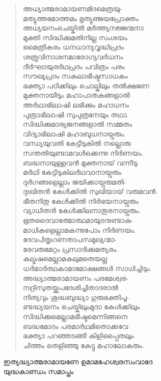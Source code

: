 \begin{verse}
അധ്യാത്മരാമായണമിദമെത്രയു-\\
മത്യുത്തമോത്തമം മൃത്യുഞ്ജയപ്രോക്തം\\
അധ്യയനംചെയ്കില്‍ മര്‍ത്ത്യനജ്ജന്മനാ\\
മുക്തി സിദ്ധിക്കുമതിനില്ല സംശയം.\\
മൈത്രീകരം ധനധാന്യവൃദ്ധിപ്രദം\\
ശത്രുവിനാശനമാരോഗ്യവര്‍ധനം\\
ദീര്‍ഘായുരര്‍ഥപ്രദം പവിത്രം പരം\\
സൗഖ്യപ്രദം സകലാഭീഷ്ടസാധകം\\
ഭക്ത്യാ പഠിക്കിലും ചൊല്കിലും തല്‍ക്ഷണേ\\
മുക്തനായീടും മഹാപാതകങ്ങളാല്‍\\
അര്‍ഥാഭിലാഷി ലഭിക്കും മഹാധനം\\
പുത്രാഭിലാഷി സുപുത്രനേയും തഥാ.\\
സിദ്ധിക്കുമാര്യജനങ്ങളാല്‍ സമ്മതം\\
വിദ്യാഭിലാഷി മഹാബുധനായ്വരും.\\
വന്ധ്യയുവതി കേട്ടീടുകില്‍ നല്ലൊരു\\
സന്തതിയുണ്ടാമവള്‍ക്കെന്നു നിര്‍ണയം.\\
ബദ്ധനായുള്ളവന്‍ മുക്തനായ് വന്നീടു-\\
മര്‍ഥി കേട്ടീടുകിലര്‍ഥവാനായ്വരും\\
ദുര്‍ഗങ്ങളെല്ലാം ജയിക്കായ്വരുമതി-\\
ദുഃഖിതന്‍ കേള്‍ക്കില്‍ സുഖിയായ് വരുമവന്‍.\\
ഭീതനിതു കേള്‍ക്കില്‍ നിര്‍ഭയനായ്വരും\\
വ്യാധിതന്‍ കേള്‍ക്കിലനാതുരനായ്വരും.\\
ഭൂതദൈവാത്മോത്ഥമായുടനുണ്ടാകു-\\
മാധികളെല്ലാമകന്നുപോം നിര്‍ണയം.\\
ദേവപിതൃഗണതാപസമുഖ്യന്മാ-\\
രേവരുമേറ്റം പ്രസാദിക്കുമത്യരം.\\
കല്മഷമെല്ലാമകലുമതെയല്ല\\
ധര്‍മാര്‍ത്ഥകാമാമോക്ഷങ്ങള്‍ സാധിച്ചിടും.\\
അദ്ധ്യാത്മരാമായണം പരമേശ്വര-\\
നദ്രിസുതയ്ക്കുപദേശിച്ചിതാദരാല്‍\\
നിത്യവും ശുദ്ധബുദ്ധ്യാ ഗുരുഭക്തിപൂ-\\
ണ്ടദ്ധ്യയനം ചെയ്കിലുംമുദാ കേള്‍ക്കിലും\\
സിദ്ധിക്കുമെല്ലാമഭീഷ്ടമെന്നിങ്ങനെ\\
ബദ്ധമോദം പരമാര്‍ഥമിതൊക്കവേ\\
ഭക്ത്യാ പറഞ്ഞടങ്ങീ കിളിപ്പൈതലും\\
ചിത്തം തെളിഞ്ഞു കേട്ടു മഹാലോകരും.
\end{verse}

\begin{center}
ഇത്യദ്ധ്യാത്മരാമായണേ ഉമാമഹേശ്വരസംവാദേ\\
യുദ്ധകാണ്ഡം സമാപ്തം
\end{center}
